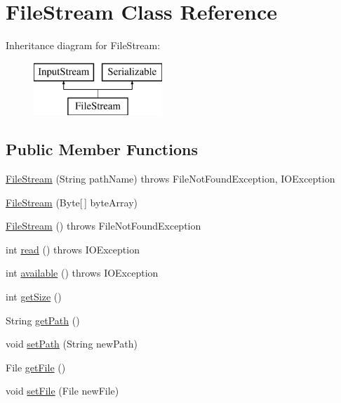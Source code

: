 \hypertarget{class_file_stream}{}\section{File\+Stream Class Reference}
\label{class_file_stream}
Inheritance diagram for File\+Stream\+:\begin{figure}[H]
\begin{center}
\leavevmode
\includegraphics[height=2.000000cm]{class_file_stream}
\end{center}
\end{figure}
\subsection*{Public Member Functions}
\begin{DoxyCompactItemize}
\item 
\mbox{\hyperlink{class_file_stream_a120b1fd6e4c74e93199d063da1c65b98}{File\+Stream}} (String path\+Name)  throws File\+Not\+Found\+Exception, I\+O\+Exception 
\item 
\mbox{\hyperlink{class_file_stream_a69fed4812620e26c3fd23560993bf7b3}{File\+Stream}} (Byte\mbox{[}$\,$\mbox{]} byte\+Array)
\item 
\mbox{\hyperlink{class_file_stream_aa919eed4082491d09520911563d44efd}{File\+Stream}} ()  throws File\+Not\+Found\+Exception    
\item 
int \mbox{\hyperlink{class_file_stream_a7f2ea40eff2241931a4ca971364cd532}{read}} ()  throws I\+O\+Exception 
\item 
int \mbox{\hyperlink{class_file_stream_a7dd240b96afa9e37f9a6bd8e4b99e48b}{available}} ()  throws I\+O\+Exception     
\item 
int \mbox{\hyperlink{class_file_stream_ab8f4d0c94a6c1357c7af77a4121e52fc}{get\+Size}} ()
\item 
String \mbox{\hyperlink{class_file_stream_ab5040ef2d7c336c123902ab493001866}{get\+Path}} ()
\item 
void \mbox{\hyperlink{class_file_stream_a10b53b74a061e2bedc6fadbfaa5660b5}{set\+Path}} (String new\+Path)
\item 
File \mbox{\hyperlink{class_file_stream_a0e12c8a0391372eebb0d444014af6c58}{get\+File}} ()
\item 
void \mbox{\hyperlink{class_file_stream_a0885a5602d71d48e503d6b19ac40bc17}{set\+File}} (File new\+File)
\end{DoxyCompactItemize}


